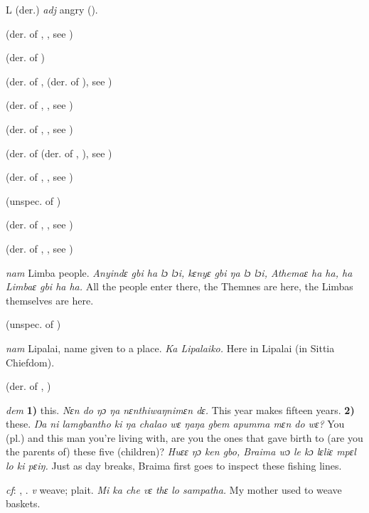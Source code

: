 \begin{letter}{L}
 (der.) \textit{adj} angry (\citealt{Pichl1967}).

 (der. of , , see )

 (der. of ) 

 (der. of ,  (der. of ), see ) 

 (der. of , , see ) 

 (der. of , , see )

 (der. of  (der. of , ), see ) 

 (der. of , , see ) 

 (unspec. of ) 

 (der. of , , see ) 

 (der. of , , see ) 

 \textit{nam} Limba people. \textit{Anyindɛ gbi ha lɔ lɔi, kɛnyɛ gbi ŋa lɔ lɔi, Athemaɛ ha ha, ha Limbaɛ gbi ha ha.} All the people enter there, the Themnes are here, the Limbas themselves are here.

 (unspec. of ) 

 \textit{nam} Lipalai, name given to a place. \textit{Ka Lipalaiko.} Here in Lipalai (in Sittia Chiefdom).


 (der. of , ) 

 \textit{dem} \textbf{1)} this. \textit{Nɛn do ŋɔ ŋa nɛnthiwaŋnimɛn dɛ.} This year makes fifteen years. \textbf{2)} these. \textit{Ŋa ni lamgbantho ki ŋa chalao wɛ ŋaŋa gbem apumma mɛn do wɛ?} You (pl.) and this man you're living with, are you the ones that gave birth to (are you the parents of) these five (children)? \textit{Huɛɛ ŋɔ ken gbo, Braima wɔ le kɔ lɛliɛ mpɛl lo ki pɛiŋ.} Just as day breaks, Braima first goes to inspect these fishing lines.

 \textit{cf}: , . \textit{v} weave; plait. \textit{Mi ka che vɛ thɛ lo sampatha.} My mother used to weave baskets.


\end{letter}
